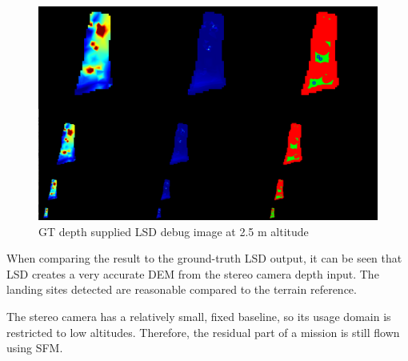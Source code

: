 \begin{figure}[ht!]
    \centering
    \includegraphics[scale=0.25]{images/stereo_camera_depth/GT_2.5m.png}
    \caption{GT depth supplied LSD debug image at 2.5 m altitude}
    \label{stereo_GT}
\end{figure}

When comparing the result to the ground-truth LSD output, it can be seen that LSD creates a very accurate DEM from the stereo camera depth input. The landing sites detected are reasonable compared to the terrain reference. 

The stereo camera has a relatively small, fixed baseline, so its usage domain is restricted to low altitudes. Therefore, the residual part of a mission is still flown using SFM. 